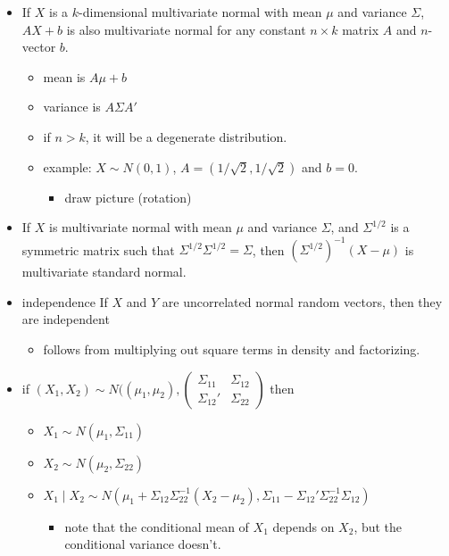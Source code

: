\begin{itemize}
\item If $X$ is a $k$-dimensional multivariate normal with mean $\mu$
        and variance $\Sigma$, $A X + b$ is also multivariate normal for
        any constant $n \times k$ matrix $A$ and $n$-vector $b$.
\begin{itemize}
\item mean is $A \mu + b$
\item variance is $A \Sigma A'$
\item if $n > k$, it will be a degenerate distribution.
\item example: $X \sim N(0,1)$, $A = (1/\sqrt{2}, 1/\sqrt{2})$ and
            $b = 0$.
\begin{itemize}
\item draw picture (rotation)
\end{itemize}
\end{itemize}
\item If $X$ is multivariate normal with mean $\mu$ and variance
        $\Sigma$, and $\Sigma^{1/2}$ is a symmetric matrix such that
        $\Sigma^{1/2} \Sigma^{1/2} = \Sigma$, then
        $(\Sigma^{1/2})^{-1} (X - \mu)$ is multivariate standard
        normal.
\item independence
        If $X$ and $Y$ are uncorrelated normal random vectors, then they
        are independent
\begin{itemize}
\item follows from multiplying out square terms in density and
          factorizing.
\end{itemize}
\item if $(X_1,X_2) \sim N((\mu_1,\mu_2), \begin{pmatrix} \Sigma_{11} & \Sigma_{12} \\ \Sigma_{12}' & \Sigma_{22} \end{pmatrix}$ then
\begin{itemize}
\item $X_1 \sim N(\mu_1, \Sigma_{11})$
\item $X_2 \sim N(\mu_2, \Sigma_{22})$
\item $X_1 \mid X_2 \sim N(\mu_1 + \Sigma_{12} \Sigma_{22}^{-1} (X_2 - \mu_2), \Sigma_{11} - \Sigma_{12}'\Sigma_{22}^{-1} \Sigma_{12})$
\begin{itemize}
\item note that the conditional mean of $X_1$ depends on $X_2$, but the conditional variance doesn't.
\end{itemize}
\end{itemize}

\end{itemize}
